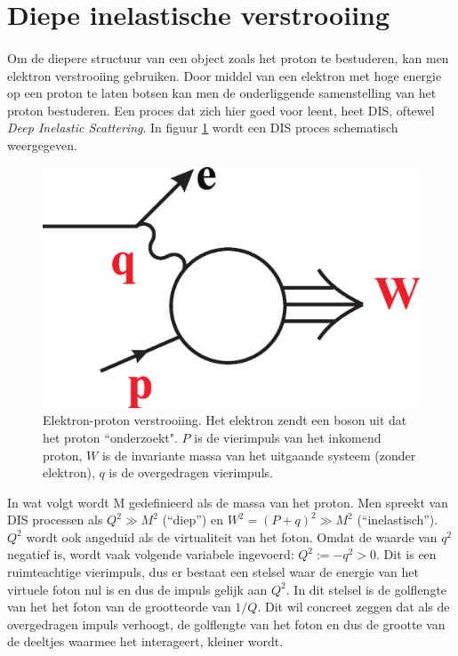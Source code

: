 \documentclass[a4paper,11pt]{article}
\numberwithin{equation}{section} %
\begin{document}
\thispagestyle{empty}
\newpage

\tableofcontents
\thispagestyle{empty}
\newpage

\section{Diepe inelastische verstrooiing}
      \paragraph{}
Om de diepere structuur van een object zoals het proton te bestuderen, kan men elektron verstrooiing gebruiken.
Door middel van een elektron met hoge energie op een proton te laten botsen kan men de onderliggende samenstelling van het proton bestuderen.
Een proces dat zich hier goed voor leent, heet DIS, oftewel \textit{Deep Inelastic Scattering}. In figuur \ref{fig:DIS} wordt een DIS proces schematisch weergegeven.
\begin{figure} [H]
  \begin{center}
    \includegraphics[width=.33\textwidth]{Afbeeldingen/DIS.eps}
    \caption{Elektron-proton verstrooiing.
Het elektron zendt een boson uit dat het proton “onderzoekt".
$P$ is de vierimpuls van het inkomend proton, $W$ is de invariante massa van het uitgaande systeem (zonder elektron), $q$ is de overgedragen vierimpuls. \cite{Martin}}
   \label{fig:DIS}
  \end{center}
\end{figure}
 In wat volgt wordt M gedefinieerd als de massa van het proton. Men spreekt van DIS processen als $Q^2 \gg M^2$ (“diep”) en $W^2 = (P+q)^2 \gg M^2$ (“inelastisch”).
$Q^2$ wordt ook angeduid als de virtualiteit van het foton.
Omdat de waarde van $q^2$ negatief is, wordt vaak volgende variabele ingevoerd: $Q^2 :=-q^2 > 0$.  Dit is een ruimteachtige vierimpuls, dus er bestaat een stelsel waar de energie van het virtuele foton nul is en dus de impuls gelijk aan $Q^2$. In dit stelsel is de golflengte van het het foton van de grootteorde van $1/Q$.
Dit wil concreet zeggen dat als de overgedragen impuls verhoogt, de golflengte van het foton en dus de grootte van de deeltjes waarmee het interageert, kleiner wordt.
\end{document}
